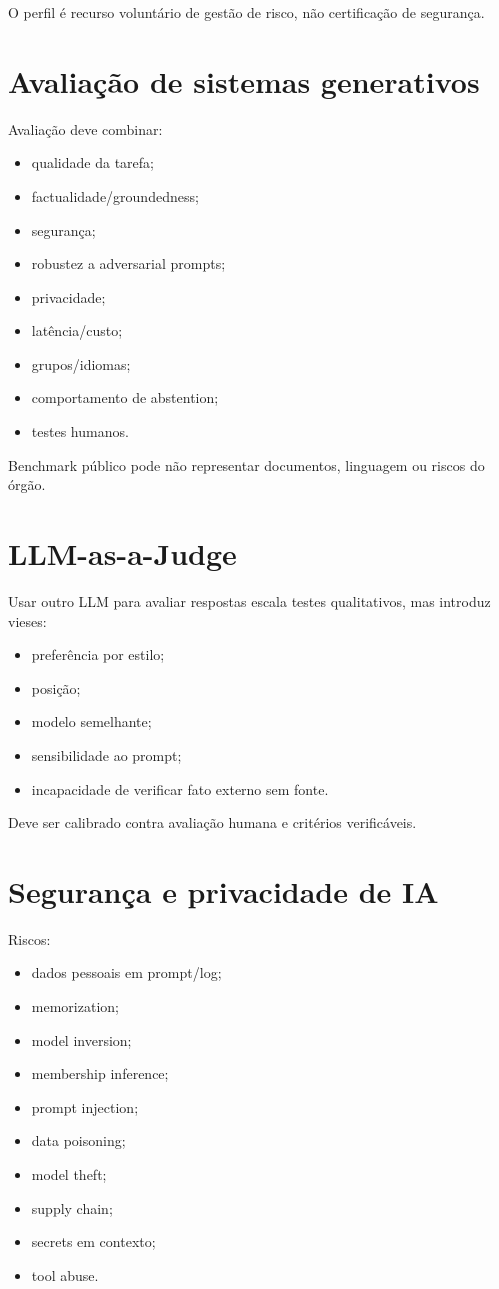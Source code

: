 O perfil é recurso voluntário de gestão de risco, não certificação de segurança.

\section{Avaliação de sistemas generativos}

Avaliação deve combinar:
\begin{itemize}
\item qualidade da tarefa;
\item factualidade/groundedness;
\item segurança;
\item robustez a adversarial prompts;
\item privacidade;
\item latência/custo;
\item grupos/idiomas;
\item comportamento de abstention;
\item testes humanos.
\end{itemize}

Benchmark público pode não representar documentos, linguagem ou riscos do órgão.

\section{LLM-as-a-Judge}

Usar outro LLM para avaliar respostas escala testes qualitativos, mas introduz vieses:
\begin{itemize}
\item preferência por estilo;
\item posição;
\item modelo semelhante;
\item sensibilidade ao prompt;
\item incapacidade de verificar fato externo sem fonte.
\end{itemize}

Deve ser calibrado contra avaliação humana e critérios verificáveis.

\section{Segurança e privacidade de IA}

Riscos:
\begin{itemize}
\item dados pessoais em prompt/log;
\item memorization;
\item model inversion;
\item membership inference;
\item prompt injection;
\item data poisoning;
\item model theft;
\item supply chain;
\item secrets em contexto;
\item tool abuse.
\end{itemize}

